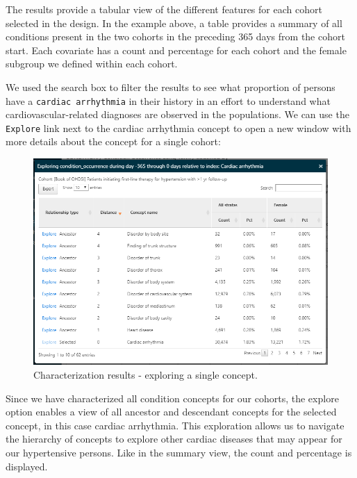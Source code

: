 \documentclass[11pt]{book}
\theoremstyle{definition}
\theoremstyle{definition}
\theoremstyle{definition}
\theoremstyle{remark}
\begin{document}
The results provide a tabular view of the different features for each cohort selected in the design. In the example above, a table provides a summary of all conditions present in the two cohorts in the preceding 365 days from the cohort start. Each covariate has a count and percentage for each cohort and the female subgroup we defined within each cohort.

We used the search box to filter the results to see what proportion of persons have a \texttt{cardiac\ arrhythmia} in their history in an effort to understand what cardiovascular-related diagnoses are observed in the populations. We can use the \texttt{Explore} link next to the cardiac arrhythmia concept to open a new window with more details about the concept for a single cohort:

\begin{figure}

{\centering \includegraphics[width=1\linewidth]{images/Characterization/atlasCharacterizationResultsExplore} 

}

\caption{Characterization results - exploring a single concept.}\label{fig:atlasCharacterizationResultsExplore}
\end{figure}

Since we have characterized all condition concepts for our cohorts, the explore option enables a view of all ancestor and descendant concepts for the selected concept, in this case cardiac arrhythmia. This exploration allows us to navigate the hierarchy of concepts to explore other cardiac diseases that may appear for our hypertensive persons. Like in the summary view, the count and percentage is displayed.
\end{document}
